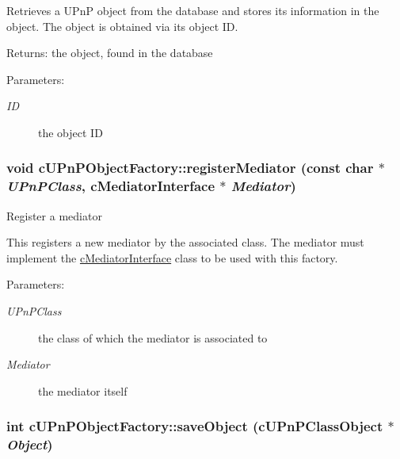 Retrieves a UPnP object from the database and stores its information in the object. The object is obtained via its object ID.

\begin{Desc}
\item[Returns:]the object, found in the database \end{Desc}
\begin{Desc}
\item[Parameters:]
\begin{description}
\item[{\em ID}]the object ID \end{description}
\end{Desc}
 \hypertarget{classcUPnPObjectFactory_f2b20dffcd46c08d5b2de4b6807e0689}{
\subsubsection[{registerMediator}]{\setlength{\rightskip}{0pt plus 5cm}void cUPnPObjectFactory::registerMediator (const char $\ast$ {\em UPnPClass}, \/  {\bf cMediatorInterface} $\ast$ {\em Mediator})}}
\label{classcUPnPObjectFactory_f2b20dffcd46c08d5b2de4b6807e0689}


Register a mediator

This registers a new mediator by the associated class. The mediator must implement the \hyperlink{classcMediatorInterface}{cMediatorInterface} class to be used with this factory.

\begin{Desc}
\item[Parameters:]
\begin{description}
\item[{\em UPnPClass}]the class of which the mediator is associated to \item[{\em Mediator}]the mediator itself \end{description}
\end{Desc}
\hypertarget{classcUPnPObjectFactory_1b521c8cfa3507bec49274b606d5d2c5}{
\subsubsection[{saveObject}]{\setlength{\rightskip}{0pt plus 5cm}int cUPnPObjectFactory::saveObject ({\bf cUPnPClassObject} $\ast$ {\em Object})}}
\label{classcUPnPObjectFactory_1b521c8cfa3507bec49274b606d5d2c5}


